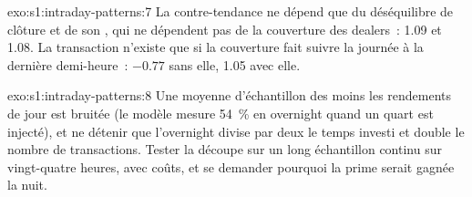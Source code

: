\begin{solution}{exo:s1:intraday-patterns:7}
La contre-tendance ne dépend que du déséquilibre de clôture et de son , qui ne dépendent pas de la couverture des dealers~: 1.09 et 1.08. La
transaction n'existe que si la couverture fait suivre la journée à la dernière demi-heure~: $-0.77$ sans elle, 1.05 avec elle.
\end{solution}

\begin{solution}{exo:s1:intraday-patterns:8}
Une moyenne d'échantillon des  moins les rendements de jour est bruitée (le modèle mesure 54~\% en overnight quand un quart est injecté), et ne détenir que l'overnight
divise par deux le temps investi et double le nombre de transactions. Tester la découpe sur un long échantillon continu sur vingt-quatre heures, avec coûts, et se demander pourquoi la prime serait gagnée
la nuit.
\end{solution}

